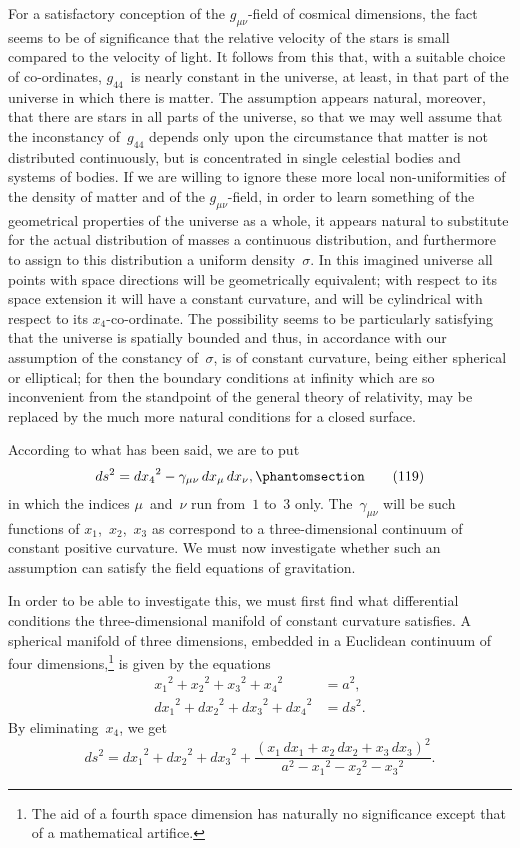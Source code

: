 \documentclass[12pt]{book}[2005/09/16]
\newcommand{\Change}[2]{#2}
\newcommand{\Add}[1]{\Change{}{#1}}
\newcommand{\PageSep}[1]{\ignorespaces}
\newcommand{\Tag}[1]{%
  \phantomsection
  \label{eqn:#1}
  \tag*{#1}
}
\begin{document}
For a satisfactory conception of the $g_{\mu\nu}$-field of cosmical
dimensions, the fact seems to be of significance that the
relative velocity of the stars is small compared to the
velocity of light. It follows from this that, with a suitable
\PageSep{114}
choice of co-ordinates, $g_{44}$~is nearly constant in the
universe, at least, in that part of the universe in which
there is matter. The assumption appears natural, moreover,
that there are stars in all parts of the universe, so
that we may well assume that the inconstancy of~$g_{44}$
depends only upon the circumstance that matter is not
distributed continuously, but is concentrated in single
celestial bodies and systems of bodies. If we are willing
to ignore these more local non-uniformities of the density
of matter and of the $g_{\mu\nu}$-field, in order to learn something
of the geometrical properties of the universe as a whole,
it appears natural to substitute for the actual distribution
of masses a continuous distribution, and furthermore to
assign to this distribution a uniform density~$\sigma$. In this
imagined universe all points with space directions will
be geometrically equivalent; with respect to its space
extension it will have a constant curvature, and will be
cylindrical with respect to its $x_{4}$-co-ordinate. The possibility
seems to be particularly satisfying that the universe
is spatially bounded and thus, in accordance with our
assumption of the constancy of~$\sigma$, is of constant curvature,
being either spherical or elliptical; for then the boundary
conditions at infinity which are so inconvenient from the
standpoint of the general theory of relativity, may be
replaced by the much more natural conditions for a closed
surface.

According to what has been said, we are to put
\[
ds^{2} = {dx_{4}}^{2} - \gamma_{\mu\nu}\, dx_{\mu}\, dx_{\nu}\Add{,}
\Tag{(119)}
\]
in which the indices $\mu$~and~$\nu$ run from~$1$ to~$3$ only. The~$\gamma_{\mu\nu}$
\PageSep{115}
will be such functions of $x_{1}$,~$x_{2}$,~$x_{3}$ as correspond
to a three-dimensional continuum of constant positive
curvature. We must now investigate whether such an
assumption can satisfy the field equations of gravitation.

In order to be able to investigate this, we must first
find what differential conditions the three-dimensional
manifold of constant curvature satisfies. A spherical
manifold of three dimensions, embedded in a Euclidean
continuum of four dimensions,\footnote
  {The aid of a fourth space dimension has naturally no significance
  except that of a mathematical artifice.}
is given by the equations
\begin{align*}
{x_{1}}^{2} + {x_{2}}^{2} + {x_{3}}^{2} + {x_{4}}^{2} &= a^{2}\Add{,} \\
{dx_{1}}^{2} + {dx_{2}}^{2} + {dx_{3}}^{2} + {dx_{4}}^{2} &= ds^{2}.
\end{align*}
By eliminating~$x_{4}$, we get
\[
ds^{2} = {dx_{1}}^{2} + {dx_{2}}^{2} + {dx_{3}}^{2}
  + \frac{(x_{1}\, dx_{1} + x_{2}\, dx_{2} + x_{3}\, dx_{3})^{2}}
         {a^{2} - {x_{1}}^{2} - {x_{2}}^{2} - {x_{3}}^{2}}.
\]
\end{document}
